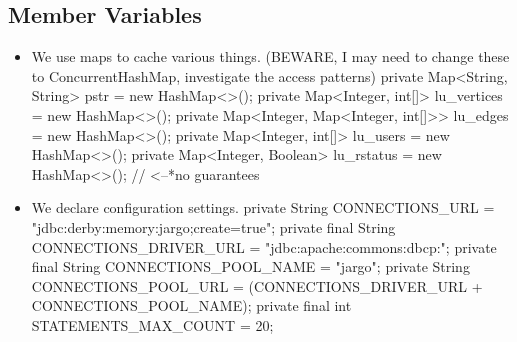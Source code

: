\documentclass{article}
\def\nwendcode{\endtrivlist \endgroup}      %
\theoremstyle{definition}                   %
\begin{document}
\subsection{Member Variables}
\label{sec:member-variables}
\begin{itemize}
\item We use maps to cache various things. (BEWARE, I may need to change these
to ConcurrentHashMap, investigate the access patterns)
\nwenddocs{}\endmoddef{}
private Map<String, String> pstr = new HashMap<>();
private Map<Integer, int[]> lu_vertices = new HashMap<>();
private Map<Integer, Map<Integer, int[]>> lu_edges = new HashMap<>();
private Map<Integer, int[]> lu_users = new HashMap<>();
private Map<Integer, Boolean> lu_rstatus = new HashMap<>();  // <--*no guarantees
\eatline
{}\nwendcode{}\item We declare configuration settings.
\nwenddocs{}\plusendmoddef
private String CONNECTIONS_URL = "jdbc:derby:memory:jargo;create=true";
private final String CONNECTIONS_DRIVER_URL = "jdbc:apache:commons:dbcp:";
private final String CONNECTIONS_POOL_NAME = "jargo";
private String CONNECTIONS_POOL_URL = (CONNECTIONS_DRIVER_URL + CONNECTIONS_POOL_NAME);
private final int STATEMENTS_MAX_COUNT = 20;

\end{itemize}
\end{document}
